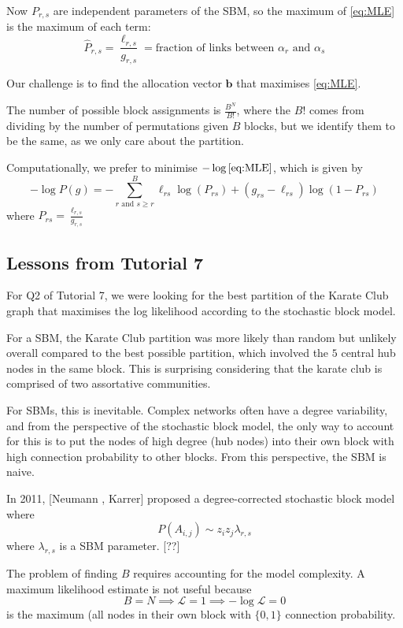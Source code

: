 \documentclass[12pt]{article}
\theoremstyle{definition}
\newcommand{\br}[1]{\left({#1}\right)}
\begin{document}
Now $P_{r,s}$ are independent parameters of the SBM, so the maximum of \eqref{eq:MLE} is the maximum of each term:
\[ \hat P_{r,s} = \frac{\ell_{r,s}}{g_{r,s}} = \text{fraction of links between }\alpha_r \text{ and }\alpha_s\]

Our challenge is to find the allocation vector $\boldsymbol{b}$ that maximises \eqref{eq:MLE}.

The number of possible block assignments is $\frac{B^N}{B!}$, where the $B!$ comes from dividing by the number of permutations given $B$ blocks, but we identify them to be the same, as we only care about the partition. 

Computationally, we prefer to minimise $-\log{\eqref{eq:MLE}}$, which is given by 
\[
-\log P\br{g} = -\sum_{r\text{ and }s\geq r}^B \ell_{rs} \log(P_{rs}) +\br{g_{rs}-\ell_{rs}}\log(1-P_{rs})
\]
where $P_{rs} = \frac{\ell_{r,s}}{g_{r,s}}$

\subsection{Lessons from Tutorial 7}

For Q2 of Tutorial 7, we were looking for the best partition of the Karate Club graph that maximises the log likelihood according to the stochastic block model.

For a SBM, the Karate Club partition was more likely than random but unlikely overall compared to the best possible partition, which involved the $5$ central hub nodes in the same block. This is surprising considering that the karate club is comprised of two assortative communities.

For SBMs, this is inevitable. Complex networks often have a degree variability, and from the perspective of the stochastic block model, the only way to account for this is to put the nodes of high degree (hub nodes) into their own block with high connection probability to other blocks. From this perspective, the SBM is naive.

In 2011, [Neumann , Karrer] proposed a degree-corrected stochastic block model where
\[ P(A_{i,j}) \sim z_iz_j \lambda_{r,s}\]
where $\lambda_{r,s}$ is a SBM parameter. [??]

The problem of finding $B$ requires accounting for the model complexity. A maximum likelihood estimate is not useful because 
\[ B = N \implies \mathcal L = 1\implies -\log \mathcal L = 0\]
is the maximum (all nodes in their own block with $\{0,1\}$ connection probability. 
\end{document}
